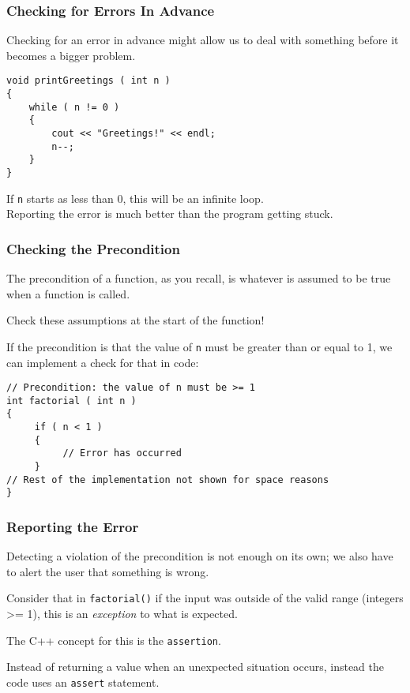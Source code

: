 \begin{frame}[fragile]
\frametitle{Checking for Errors In Advance}

Checking for an error in advance might allow us to deal with something before it becomes a bigger problem.

\begin{verbatim}
void printGreetings ( int n )
{
    while ( n != 0 )
    {
        cout << "Greetings!" << endl;
        n--;
    }
}
\end{verbatim}
If \texttt{n} starts as less than 0, this will be an infinite loop.\\
\quad Reporting the error is much better than the program getting stuck.


\end{frame}

\begin{frame}[fragile]
\frametitle{Checking the Precondition}
The precondition of a function, as you recall, is whatever is assumed to be true when a function is called.

Check these assumptions at the start of the function!

If the precondition is that the value of \texttt{n} must be greater than or equal to 1, we can implement a check for that in code:

\begin{verbatim}
// Precondition: the value of n must be >= 1
int factorial ( int n )
{
     if ( n < 1 )
     {
          // Error has occurred
     }
// Rest of the implementation not shown for space reasons
}
\end{verbatim}

\end{frame}

\begin{frame}
\frametitle{Reporting the Error}
Detecting a violation of the precondition is not enough on its own; we also have to alert the user that something is wrong.

Consider that in \texttt{factorial()} if the input was outside of the valid range (integers >= 1), this is an \textit{exception} to what is expected.

The C++ concept for this is the \texttt{assertion}.

Instead of returning a value when an unexpected situation occurs, instead the code uses an \texttt{assert} statement.

\end{frame}




